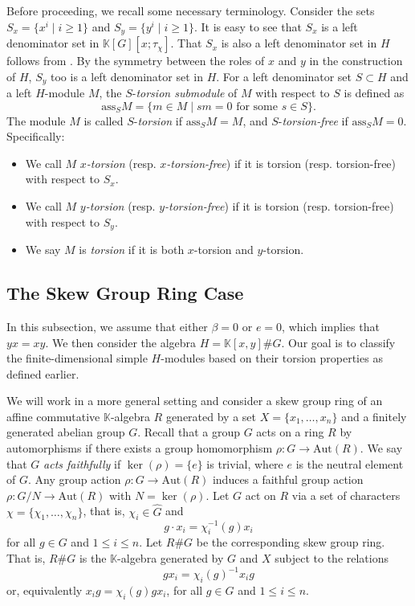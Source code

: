 \documentclass[11pt, twoside]{amsart}
\theoremstyle{definition}
\newcommand{\KK}{\mathbb{K}}
\begin{document}
Before proceeding, we recall some necessary terminology. Consider the sets $S_x = \{x^i \mid i \ge 1\}$ and $S_y = \{y^i \mid i \ge 1\}$. It is easy to see that $S_x$ is a left denominator set in $\KK[G][x; \tau_\chi]$. That $S_x$ is also a left denominator set in $H$ follows from \cite[Lemma 1.4]{Goodearl}. By the symmetry between the roles of $x$ and $y$ in the construction of $H$, $S_y$ too is a left denominator set in $H$. For a left denominator set $S \subset H$ and a left $H$-module $M$, the $S$-\emph{torsion submodule} of $M$ with respect to $S$ is defined as
%
\[ \mathrm{ass}_S M = \{ m \in M \mid sm=0 \text{ for some } s \in S\}. \]
%
The module $M$ is called $S$-\emph{torsion} if $\mathrm{ass}_S M = M$, and $S$-\emph{torsion-free} if $\mathrm{ass}_S M = 0$. Specifically:
\begin{itemize}
    \item[(i)] We call $M$ \emph{$x$-torsion} (resp. \emph{$x$-torsion-free}) if it is torsion (resp. torsion-free) with respect to $S_x$.
    \item[(ii)] We call $M$ \emph{$y$-torsion} (resp. \emph{$y$-torsion-free}) if it is torsion (resp. torsion-free) with respect to $S_y$.
    \item[(iii)] We say $M$ is \emph{torsion} if it is both $x$-torsion and $y$-torsion.
\end{itemize}

\subsection{The Skew Group Ring Case}
In this subsection, we assume that either $\beta = 0$ or $e = 0$, which implies that $yx = xy$. We then consider the algebra $H = \KK[x, y] \# G$. Our goal is to classify the finite-dimensional simple $H$-modules based on their torsion properties as defined earlier.

We will work in a more general setting and consider a skew group ring of an affine commutative $\KK$-algebra $R$ generated by a set $X = \{x_1, \ldots, x_n \}$ and a finitely generated abelian group $G$. Recall that a group $G$ acts on a ring $R$ by automorphisms if there exists a group homomorphism $\rho:G \to \text{Aut}(R)$. We say that $G$ \emph{acts faithfully} if $\ker(\rho) = \{e\}$ is trivial, where $e$ is the neutral element of $G$. Any group action $\rho:G \to \text{Aut}(R)$ induces a faithful group action $\rho:G/N \to \text{Aut}(R)$ with $N = \ker(\rho)$. Let $G$ act on $R$ via a set of characters $\chi = \{\chi_1, \ldots, \chi_n\}$, that is, $\chi_i \in \widehat{G}$ and
%
\[g\cdot x_i = \chi_{i}^{-1}(g)x_i\]
%
for all $g \in G$ and $1 \leq i \leq n$. Let $R\# G$ be the corresponding skew group ring. That is, $R\# G$ is the $\KK$-algebra generated by $G$ and $X$ subject to the relations
%
\[gx_i = \chi_{i}(g)^{-1}x_i g\]
%
or, equivalently $x_i g = \chi_{i}(g)gx_i$, for all $g \in G$ and $1 \leq i \leq n$. 
\end{document}
